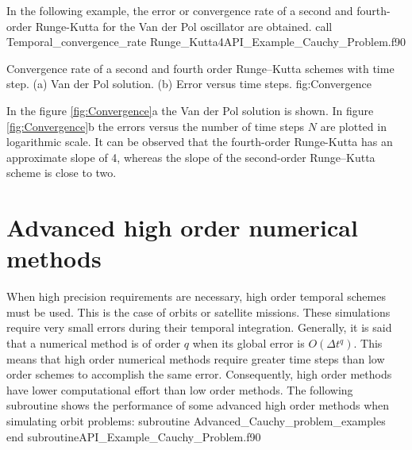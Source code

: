      In the following example, the error or convergence rate  of a second and fourth-order  Runge-Kutta for the Van der Pol oscillator are obtained. 
       \vspace{0.5cm} 
        {call Temporal_convergence_rate}
        {Runge_Kutta4}{API_Example_Cauchy_Problem.f90}
       
        \twographs{}
                  {}
                  {Convergence rate of a second and fourth order Runge--Kutta schemes with time step.
                     (a) Van der Pol solution.
                     (b) Error versus time steps. }
                     {fig:Convergence}   
     
      In the figure \ref{fig:Convergence}a the Van der Pol solution is shown. 
      In figure \ref{fig:Convergence}b the errors versus the number of time steps $ N $ are plotted in logarithmic scale.  
      It can be observed that the fourth-order Runge-Kutta has an approximate slope of 4, whereas the slope of the second-order Runge--Kutta scheme is close to two.    
   
   
  
 \newpage                            
 \section{Advanced high order numerical methods}
 When high precision requirements are necessary, high order temporal schemes must be used. 
 This is the case of orbits or satellite missions. These simulations require very small errors during their temporal integration. 
 Generally, it is said that a numerical method is of order $ q $ when its global error is  $ O(\Delta t^q) $.
 This means that high order numerical methods require greater time steps than low order schemes to accomplish the same error. 
 Consequently, high order methods have lower computational effort than low order methods. 
 The following subroutine shows the performance of  some advanced high order methods when simulating orbit problems:
        \vspace{0.2cm} 
        {subroutine Advanced_Cauchy_problem_examples}
        {end subroutine}{API_Example_Cauchy_Problem.f90}
 
